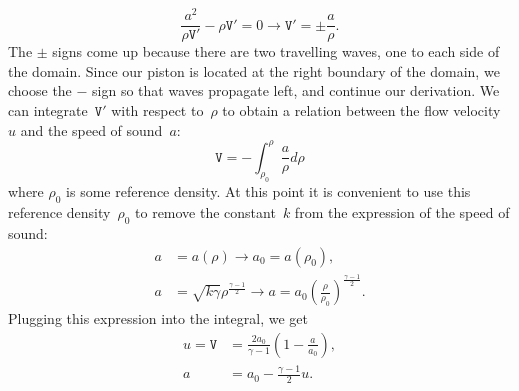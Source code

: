 \documentclass[../../thesis.tex]{subfiles}
\begin{document}
\begin{equation}
    \frac{a^2}{\rho \mathtt{V}'} - \rho \mathtt{V}' = 0 \rightarrow \mathtt{V}' = \pm \frac{a}{\rho}.
\end{equation}
The $\pm$ signs come up because there are two travelling waves, one to each side of the domain.
Since our piston is located at the right boundary of the domain, 
we choose the $-$ sign so that waves propagate left, and continue our derivation.
We can integrate~$\mathtt{V}'$ with respect to~$\rho$ to obtain a relation between the flow velocity~$u$ and the speed of sound~$a$:
\begin{equation}
    \mathtt{V} = - \int_{\rho_0}^{\rho} \frac{a}{\rho} d\rho 
\end{equation}
where $\rho_0$ is some reference density.
At this point it is convenient to use this reference density~$\rho_0$ to remove the constant~$k$ from the expression of the speed of sound:
\begin{subequations}
    \begin{align}
        a &= a(\rho) 
        \rightarrow 
        a_0 = a(\rho_0),
        \\
        a &= \sqrt{k \gamma} \rho^{\frac{\gamma-1}{2}} 
        \rightarrow
        a = a_0 \left(\frac{\rho}{\rho_0}\right)^{\frac{\gamma-1}{2}}.
    \end{align}    
\end{subequations}
Plugging this expression into the integral, we get
\begin{subequations}
    \begin{align}
        u = \mathtt{V} &= \frac{2a_0}{\gamma-1}\left(1 - \frac{a}{a_0}\right),
        \\[2mm]
        a &= a_0 - \frac{\gamma-1}{2}u. \label{eq:speed_of_sound_with_velocity}
    \end{align}
\end{subequations}
\end{document}
